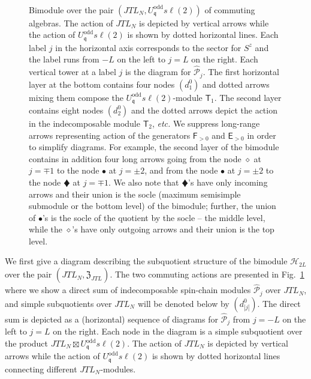 \documentclass[11pt]{article}
\newcommand{\q}{\mathfrak{q}}
\newcommand{\JTL}[1]{JTL_{#1}}
\newcommand{\LQGodd}{U^{\text{odd}}_{\q} s\ell(2)}
\newcommand{\F}{\mathsf{F}}
\newcommand{\FF}[1]{\F_{#1}}
\newcommand{\E}{\mathsf{E}}
\newcommand{\EE}[1]{\E_{#1}}
\newcommand{\Hilb}{\mathcal{H}}
\newcommand{\cent}{\mathfrak{Z}}
\newcommand{\centJTL}{\cent_{\JTL{}}}
\newcommand{\PPodd}[1]{\mathsf{T}_{#1}}
\newcommand{\TLX}{d^0}
\newcommand{\APrTL}[1]{\widehat{\mathscr{P}}_{#1}}
\theoremstyle{definition}
\begin{document}
 \begin{figure}\centering
\mbox{}\bigskip\\
\mbox{}\medskip
  \def\svgwidth{470pt}
    
      \caption{Bimodule over the pair $(\JTL{N},\LQGodd)$ of commuting
      algebras.  The action of $\JTL{N}$ is depicted by vertical
      arrows while the action of $\LQGodd$ is shown by dotted
      horizontal lines. Each label $j$ in the horizontal axis corresponds to the sector for $S^z$ and the label runs from $-L$ on the left to $j=L$ on 	
      the right. Each vertical tower at a label $j$ is the diagram for $\APrTL{j}$.
      The first horizontal layer at the bottom contains four
      nodes $(\TLX_1)$ and dotted arrows mixing them compose the
      $\LQGodd$-module $\PPodd{1}$. The second layer contains eight
      nodes $(\TLX_2)$ and the dotted arrows depict the action in the
      indecomposable module $\PPodd{2}$, {\it etc.} We
      suppress long-range arrows representing action of the generators
      $\FF{>0}$ and $\EE{>0}$ in order to simplify diagrams. For
      example, the second layer of the bimodule contains in addition
      four long arrows going from the node $\diamond$ at $j=\mp1$ to the
      node $\bullet$ at $j=\pm2$, and from the node $\bullet$ at
      $j=\pm2$ to the node {\scriptsize$\vardiamond$} at $j=\mp1$. We also note that {\scriptsize$\vardiamond$}'s have only incoming arrows and their union is the socle (maximum semisimple submodule or the bottom level) of the bimodule; further, the union of $\bullet$'s is the socle of the quotient by the socle -- the middle level, while the $\diamond$'s have only outgoing arrows and their union is the top level.}
    \label{JTL-Uqodd-bimod}
    \end{figure}

We first give a diagram describing the subquotient structure of the
bimodule $\Hilb_{2L}$ over the pair $(\JTL{N},\centJTL)$.  The two
commuting actions are presented in Fig.~\ref{JTL-Uqodd-bimod} where we
show a direct sum of indecomposable spin-chain modules $\APrTL{j}$ over
$\JTL{N}$, and simple subquotients over $\JTL{N}$ will be denoted below by
$(\TLX_{|j|})$. The direct sum is depicted as a (horizontal) sequence of
diagrams for $\APrTL{j}$ from $j=-L$ on the left to $j=L$ on the
right. Each node in the diagram is a simple subquotient over the
product $\JTL{N}\boxtimes\LQGodd$. The action of $\JTL{N}$ is depicted
by vertical arrows while the action of $\LQGodd$ is shown by dotted
horizontal lines connecting different $\JTL{N}$-modules.
\end{document}
